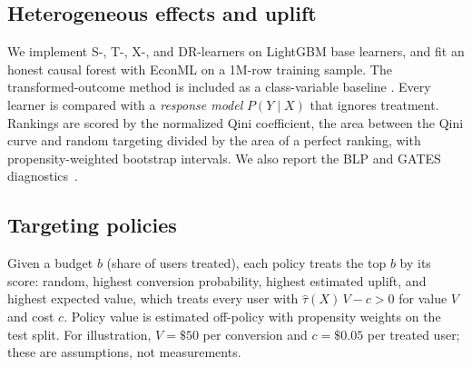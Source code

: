 \subsection{Heterogeneous effects and uplift}
\label{sec:cate-method}

We implement S-, T-, X-, and DR-learners on LightGBM base learners, and fit
an honest causal forest with EconML \cite{econml} on a 1M-row training
sample. The transformed-outcome method is included as a class-variable
baseline \cite{athey2015}. Every learner is compared with a
\emph{response model} $P(Y\mid X)$ that ignores treatment. Rankings are
scored by the normalized Qini coefficient, the area between the Qini curve
and random targeting divided by the area of a perfect ranking, with
propensity-weighted bootstrap intervals. We also report the BLP and GATES
diagnostics~\cite{chernozhukov2018gates}.

\subsection{Targeting policies}
\label{sec:policy-method}

Given a budget $b$ (share of users treated), each policy treats the top $b$
by its score: random, highest conversion probability, highest estimated
uplift, and highest expected value, which treats every user with
$\hat\tau(X)\,V - c > 0$ for value $V$ and cost $c$. Policy value is
estimated off-policy with propensity weights on the test split. For
illustration, $V=\$50$ per conversion and $c=\$0.05$ per treated user; these
are assumptions, not measurements.
